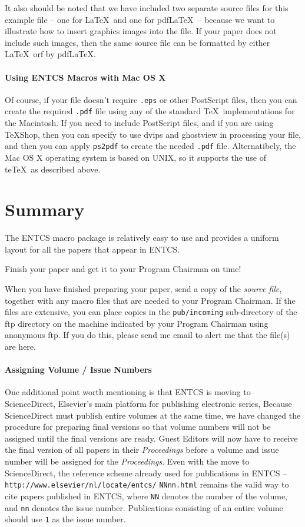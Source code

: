 \documentclass{entcs} \usepackage{entcsmacro}
\begin{document}
It also should be noted that we have included two separate source
files for this example file -- one for \LaTeX\ and one for pdf\LaTeX\ 
-- because we want to illustrate how to insert graphics images into
the file. If your paper does not include such images, then the same
source file can be formatted by either \LaTeX\ orf by pdf\LaTeX.

\paragraph{Using ENTCS Macros with Mac OS X}
Of course, if your file doesn't require \texttt{.eps} or other
PostScript files, then you can create the required \texttt{.pdf} file
using any of the standard \TeX\ implementations for the Macintosh. If
you need to include PostScript files, and if you are using \TeX Shop,
then you can specify to use dvips and ghostview in processing your
file, and then you can apply \texttt{ps2pdf} to create the needed
\texttt{.pdf} file. Alternatibely, the Mac OS X operating system is
based on UNIX, so it supports the use of te\TeX\ as described above.

\section{Summary}  The ENTCS macro package is relatively easy to use
and provides a uniform layout for all the papers that appear in ENTCS.
 
\begin{problem}
  Finish your paper and get it to your Program Chairman on time!
\end{problem}

When you have finished preparing your paper, send a copy of the
\emph{source file}, together with any macro files that are needed to
your Program Chairman.  If the files are extensive, you can place
copies in the \texttt{pub/incoming} sub-directory of the ftp directory
on the machine indicated by your Program Chairman using anonymous ftp.
If you do this, please send me email to alert me that the file(s) are
here.

\paragraph{Assigning Volume / Issue Numbers}
One additional point worth mentioning is that ENTCS is moving to
ScienceDirect, Elsevier's main platform for publishing electronic
series, Because ScienceDirect must publish entire volumes at the same
time, we have changed the procedure for preparing final versions so
that volume numbers will not be assigned until the final versions are
ready. Guest Editors will now have to receive the final version of all
papers in their \emph{Proceedings} before a volume and issue number
will be assigned for the \emph{Proceedings}. Even with the move to
ScienceDirect, the reference scheme already used for publications in
ENTCS -- \texttt{http://www.elsevier/nl/locate/entcs/}
\texttt{NNnn.html} remains the valid way to cite papers published in
ENTCS, where \texttt{NN} denotes the number of the volume, and
\texttt{nn} denotes the issue number.  Publications consisting of an
entire volume should use \texttt{1} as the issue number.
\end{document}
